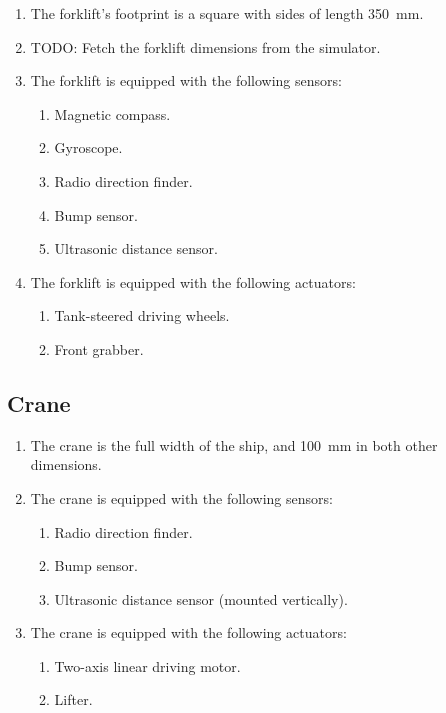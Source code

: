 \begin{enumerate}
  \item The forklift's footprint is a square with sides of length \SI{350}{mm}.
  \item TODO: Fetch the forklift dimensions from the simulator.
  \item The forklift is equipped with the following sensors:
  \begin{enumerate}
    \item Magnetic compass.
    \item Gyroscope.
    \item Radio direction finder.
    \item Bump sensor.
    \item Ultrasonic distance sensor.
  \end{enumerate}
  \item The forklift is equipped with the following actuators:
  \begin{enumerate}
    \item Tank-steered driving wheels.
    \item Front grabber.
  \end{enumerate}
\end{enumerate}

\subsection{Crane}
\label{spec:crane}

\begin{enumerate}
  \item The crane is the full width of the ship, and \SI{100}{mm}
        in both other dimensions.
  \item The crane is equipped with the following sensors:
  \begin{enumerate}
    \item Radio direction finder.
    \item Bump sensor.
    \item Ultrasonic distance sensor (mounted vertically).
  \end{enumerate}
  \item The crane is equipped with the following actuators:
  \begin{enumerate}
    \item Two-axis linear driving motor.
    \item Lifter.
  \end{enumerate}
\end{enumerate}
